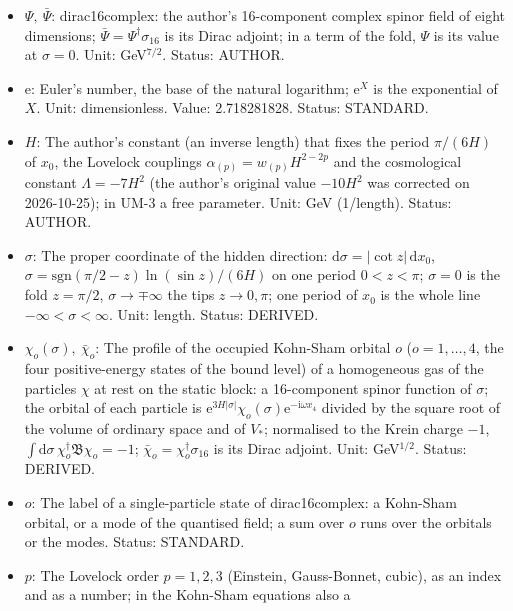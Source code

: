 \documentclass[
  10pt,
]{article}
\providecommand{\tightlist}{%
  \setlength{\itemsep}{0pt}\setlength{\parskip}{0pt}}
\begin{document}
\begin{itemize}
\tightlist
\item
  \(\Psi,\ \bar\Psi\): dirac16complex: the author's 16-component complex
  spinor field of eight dimensions;
  \(\bar\Psi = \Psi^\dagger\sigma_{16}\) is its Dirac adjoint; in a term
  of the fold, \(\Psi\) is its value at \(\sigma = 0\). Unit:
  GeV\(^{7/2}\). Status: AUTHOR.
\item
  \(\mathrm{e}\): Euler's number, the base of the natural logarithm;
  \(\mathrm{e}^{X}\) is the exponential of \(X\). Unit: dimensionless.
  Value: 2.718281828. Status: STANDARD.
\item
  \(H\): The author's constant (an inverse length) that fixes the period
  \(\pi/(6H)\) of \(x_0\), the Lovelock couplings
  \(\alpha_{(p)} = w_{(p)}H^{2-2p}\) and the cosmological constant
  \(\Lambda = -7H^2\) (the author's original value \(-10H^2\) was
  corrected on 2026-10-25); in UM-3 a free parameter. Unit: GeV
  (1/length). Status: AUTHOR.
\item
  \(\sigma\): The proper coordinate of the hidden direction:
  \(\mathrm{d}\sigma = \lvert\cot z\rvert\,\mathrm{d}x_0\),
  \(\sigma = \mathrm{sgn}(\pi/2 - z)\ln(\sin z)/(6H)\) on one period
  \(0 < z < \pi\); \(\sigma = 0\) is the fold \(z = \pi/2\),
  \(\sigma \to \mp\infty\) the tips \(z \to 0, \pi\); one period of
  \(x_0\) is the whole line \(-\infty < \sigma < \infty\). Unit: length.
  Status: DERIVED.
\item
  \(\chi_o(\sigma),\ \bar\chi_o\): The profile of the occupied Kohn-Sham
  orbital \(o\) (\(o = 1, \dots, 4\), the four positive-energy states of
  the bound level) of a homogeneous gas of the particles \(\chi\) at
  rest on the static block: a 16-component spinor function of
  \(\sigma\); the orbital of each particle is
  \(\mathrm{e}^{3H\lvert\sigma\rvert}\chi_o(\sigma)\mathrm{e}^{-\mathrm{i}\omega x_4}\)
  divided by the square root of the volume of ordinary space and of
  \(V_*\); normalised to the Krein charge \(-1\),
  \(\int\mathrm{d}\sigma\,\chi_o^\dagger\mathfrak{B}\chi_o = -1\);
  \(\bar\chi_o = \chi_o^\dagger\sigma_{16}\) is its Dirac adjoint. Unit:
  GeV\(^{1/2}\). Status: DERIVED.
\item
  \(o\): The label of a single-particle state of dirac16complex: a
  Kohn-Sham orbital, or a mode of the quantised field; a sum over \(o\)
  runs over the orbitals or the modes. Status: STANDARD.
\item
  \(p\): The Lovelock order \(p = 1, 2, 3\) (Einstein, Gauss-Bonnet,
  cubic), as an index and as a number; in the Kohn-Sham equations also a

\end{itemize}
\end{document}
